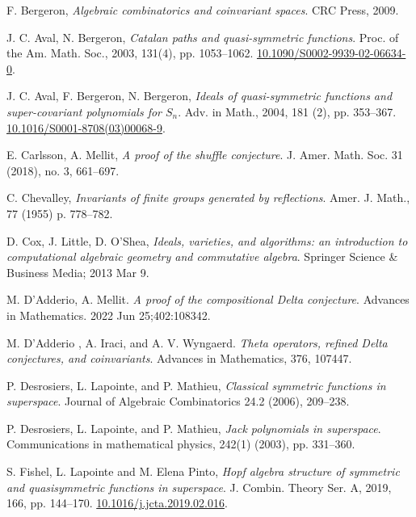 \documentclass[submission]{FPSAC2023}
\theoremstyle{definition}
\numberwithin{equation}{section}
\begin{document}
\begin{thebibliography}{999}

 F. Bergeron,
\textit{Algebraic combinatorics and coinvariant spaces}.
CRC Press, 2009.

 J. C. Aval, N. Bergeron,
\textit{Catalan paths and quasi-symmetric functions}.
Proc. of the Am. Math. Soc., 2003, 131(4), pp. 1053--1062.
\href{https://doi.org/10.1090/S0002-9939-02-06634-0}{10.1090/S0002-9939-02-06634-0}.

 J. C. Aval, F. Bergeron, N. Bergeron,
\textit{Ideals of quasi-symmetric functions and super-covariant polynomials for $S_n$}.
Adv. in Math., 2004, 181 (2), pp. 353--367.
\href{https://doi.org/10.1016/S0001-8708(03)00068-9}{10.1016/S0001-8708(03)00068-9}.

 E. Carlsson, A. Mellit,
\textit{A proof of the shuffle conjecture}.
J. Amer. Math. Soc. 31 (2018), no. 3, 661--697.

 C. Chevalley,
\textit {Invariants of finite groups generated by reflections}.
Amer. J. Math., 77 (1955) p. 778--782.

 D. Cox, J. Little, D. O'Shea,
\textit{Ideals, varieties, and algorithms: an introduction to computational
algebraic geometry and commutative algebra}.
Springer Science \& Business Media; 2013 Mar 9.

 M. D'Adderio, A. Mellit.
\textit{A proof of the compositional Delta conjecture}.
Advances in Mathematics. 2022 Jun 25;402:108342.

 M. D'Adderio , A. Iraci, and A. V. Wyngaerd.
\textit{Theta operators, refined Delta conjectures, and coinvariants}.
Advances in Mathematics, 376, 107447.

 P. Desrosiers, L. Lapointe, and P. Mathieu,
\textit{Classical symmetric functions in superspace}.
Journal of Algebraic Combinatorics 24.2 (2006), 209--238.

 P. Desrosiers, L. Lapointe, and P. Mathieu,
\textit{Jack polynomials in superspace}.
Communications in mathematical physics, 242(1) (2003), pp. 331--360.

S. Fishel, L. Lapointe and M. Elena Pinto,
\textit{Hopf algebra structure of symmetric and quasisymmetric functions in superspace}.
 {J. Combin. Theory Ser. A}, 2019, 166, pp.  {144--170}.
\href{https://doi-org/10.1016/j.jcta.2019.02.016}{10.1016/j.jcta.2019.02.016}.


\end{thebibliography}
\end{document}
